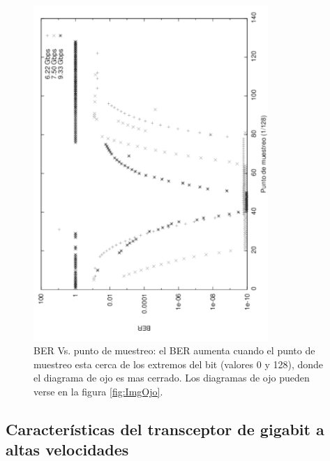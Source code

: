 \begin{figure}[t]
  \centering
    \includegraphics[width=3.5in,angle=270]{graphs/BER_sp_gray.pdf}
\caption {BER Vs. punto de muestreo: el BER aumenta cuando el punto de muestreo esta cerca de los extremos del bit (valores 0 y 128), donde el diagrama de ojo es mas cerrado. Los diagramas de ojo pueden verse en la figura \ref{fig:ImgOjo}.}
\label{fig:BERvsSamplingPoint}
\end{figure}

\subsection{Características del transceptor de gigabit a altas velocidades}


